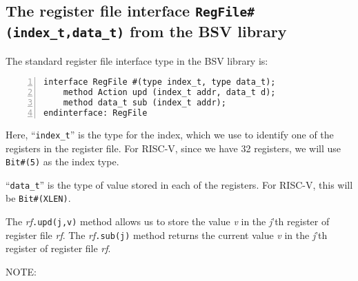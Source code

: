 
\subsection{The register file interface {\tt RegFile\#(index\_t,data\_t)} from the BSV library}

\label{Sec_RegFile_interface}



The standard register file interface type in the BSV library is:

{\small
\begin{Verbatim}[frame=single, numbers=left]
interface RegFile #(type index_t, type data_t);
    method Action upd (index_t addr, data_t d);
    method data_t sub (index_t addr);
endinterface: RegFile
\end{Verbatim}
}

Here, ``\verb|index_t|'' is the type for the index, which we use to
identify one of the registers in the register file.  For RISC-V, since
we have 32 registers, we will use \verb|Bit#(5)| as the index type.

``\verb|data_t|'' is the type of value stored in each of the
registers.  For RISC-V, this will be \verb|Bit#(XLEN)|.

The \emph{rf}{\tt.upd(j,v)} method allows us to store the value
\emph{v} in the \emph{j}'th register of register file \emph{rf}.  The
\emph{rf}{\tt.sub(j)} method returns the current value \emph{v} in the
\emph{j}'th register of register file \emph{rf}.

\vspace{2ex}

NOTE:

